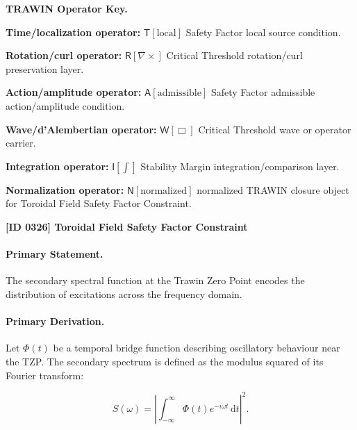 \par\vspace{0.45\baselineskip}
\noindent\begin{minipage}[t]{\linewidth}
\begingroup
\small
\raggedright
\textbf{TRAWIN Operator Key.}\par
\noindent\textbf{Time/localization operator:} $\mathsf{T}\!\left[\mathrm{local}\right]$ Safety Factor local source condition.\par
\noindent\textbf{Rotation/curl operator:} $\mathsf{R}\!\left[\nabla\times\right]$ Critical Threshold rotation/curl preservation layer.\par
\noindent\textbf{Action/amplitude operator:} $\mathsf{A}\!\left[\mathrm{admissible}\right]$ Safety Factor admissible action/amplitude condition.\par
\noindent\textbf{Wave/d'Alembertian operator:} $\mathsf{W}\!\left[\Box\right]$ Critical Threshold wave or operator carrier.\par
\noindent\textbf{Integration operator:} $\mathsf{I}\!\left[\int\right]$ Stability Margin integration/comparison layer.\par
\noindent\textbf{Normalization operator:} $\mathsf{N}\!\left[\mathrm{normalized}\right]$ normalized TRAWIN closure object for Toroidal Field Safety Factor Constraint.\par
\endgroup
\end{minipage}

\clearpage
\noindent\textbf{[ID 0326] Toroidal Field Safety Factor Constraint}\par
\vspace{0.35em}
\paragraph{Primary Statement.}

The secondary spectral function at the Trawin Zero Point encodes the distribution of excitations across the frequency domain.

\paragraph{Primary Derivation.}

Let $\Phi(t)$ be a temporal bridge function describing oscillatory behaviour near the TZP.
The secondary spectrum is defined as the modulus squared of its Fourier transform:

\begin{equation}
S(\omega) = \left| \int_{-\infty}^{\infty} \Phi(t) e^{-i\omega t} \, \mathrm{d}t \right|^2 .
\end{equation}

